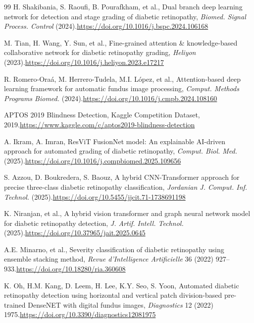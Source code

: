 \documentclass[a4paper,fleqn]{cas-dc}
\begin{document}
\begin{thebibliography}{99}
H. Shakibania, S. Raoufi, B. Pourafkham, et al.,
Dual branch deep learning network for detection and stage grading of diabetic retinopathy,
\textit{Biomed. Signal Process. Control} (2024).\newline\url{https://doi.org/10.1016/j.bspc.2024.106168}

M. Tian, H. Wang, Y. Sun, et al.,
Fine-grained attention \& knowledge-based collaborative network for diabetic retinopathy grading,
\textit{Heliyon} (2023).\newline\url{https://doi.org/10.1016/j.heliyon.2023.e17217}

R. Romero-Ora\'{a}, M. Herrero-Tudela, M.I. L\'{o}pez, et al.,
Attention-based deep learning framework for automatic fundus image processing,
\textit{Comput. Methods Programs Biomed.} (2024).\newline\url{https://doi.org/10.1016/j.cmpb.2024.108160}

APTOS 2019 Blindness Detection, Kaggle Competition Dataset, 2019.\newline\url{https://www.kaggle.com/c/aptos2019-blindness-detection}

A. Ikram, A. Imran,
ResViT FusionNet model: An explainable AI-driven approach for automated grading of diabetic retinopathy,
\textit{Comput. Biol. Med.} (2025).\newline\url{https://doi.org/10.1016/j.compbiomed.2025.109656}

S. Azzou, D. Boukredera, S. Baouz,
A hybrid CNN-Transformer approach for precise three-class diabetic retinopathy classification,
\textit{Jordanian J. Comput. Inf. Technol.} (2025).\newline\url{https://doi.org/10.5455/jjcit.71-1738691198}

K. Niranjan, et al.,
A hybrid vision transformer and graph neural network model for diabetic retinopathy detection,
\textit{J. Artif. Intell. Technol.} (2025).\newline\url{https://doi.org/10.37965/jait.2025.0645}


A.E. Minarno, et al.,
Severity classification of diabetic retinopathy using ensemble stacking method,
\textit{Revue d'Intelligence Artificielle} 36 (2022) 927--933.\newline\url{https://doi.org/10.18280/ria.360608}

K. Oh, H.M. Kang, D. Leem, H. Lee, K.Y. Seo, S. Yoon,
Automated diabetic retinopathy detection using horizontal and vertical patch division-based pre-trained DenseNET with digital fundus images,
\textit{Diagnostics} 12 (2022) 1975.\newline\url{https://doi.org/10.3390/diagnostics12081975}


\end{thebibliography}
\end{document}
